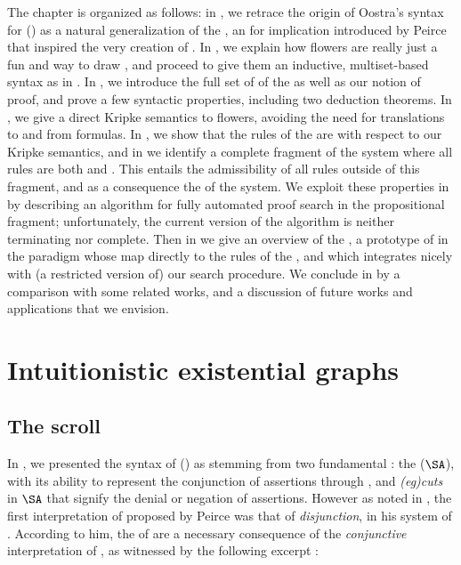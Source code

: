 \begin{scope}
\AP
The chapter is organized as follows: in , we retrace the origin of
Oostra's syntax for  ()
as a natural generalization of the \emph{}, an  for
implication introduced by Peirce that inspired the very creation of . In
, we explain how flowers are really just a fun and
 way to draw , and proceed to give them an inductive,
multiset-based syntax as in . In , we
introduce the full set of  of the  as
well as our notion of proof, and prove a few syntactic properties, including two
deduction theorems. In , we give a direct Kripke semantics to
flowers, avoiding the need for translations to and from formulas. In
, we show that the rules of the  are 
with respect to our Kripke semantics, and in  we identify a
complete fragment of the system where all rules are both \emph{}
and \emph{}. This entails the admissibility of all rules outside
of this fragment, and as a consequence the  of the system. We
exploit these properties in  by describing an algorithm
for fully automated proof search in the propositional fragment; unfortunately,
the current version of the algorithm is neither terminating nor complete. Then
in  we give an overview of the , a
prototype of  in the  paradigm whose  map
directly to the rules of the , and which integrates nicely
with (a restricted version of) our search procedure. We conclude in
 by a comparison with some related works, and a discussion of
future works and applications that we envision.


\section{Intuitionistic existential graphs}

\subsection{The scroll}

In , we presented the syntax of  () as
stemming from two fundamental : the  ($\SA$),
with its ability to represent the conjunction of assertions through
\emph{}, and \emph{\kl(eg){cuts}} in $\SA$ that signify the denial or
negation of assertions. However as noted in , the first
interpretation of  proposed by Peirce was that of
\emph{disjunction}, in his system of . According to him,
the  of  are a necessary consequence of the
\emph{conjunctive} interpretation of , as witnessed by the
following excerpt :


\end{scope}
